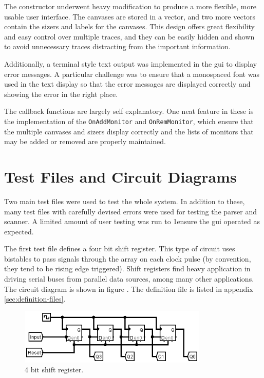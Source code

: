 \documentclass[a4paper,10pt]{article}  %
\begin{document}
The constructor underwent heavy modification to produce a more
flexible, more usable user interface. The canvases are stored in a
vector, and two more vectors contain the sizers and labels for the
canvases. This design offers great flexibility and easy control over
multiple traces, and they can be easily hidden and shown to avoid
unnecessary traces distracting from the important information.

Additionally, a terminal style text output was implemented in the gui
to display error messages. A particular challenge was to ensure that a
monospaced font was used in the text display so that the error
messages are displayed correctly and showing the error in the right
place.

The callback functions are largely self explanatory. One neat feature
in these is the implementation of the \texttt{OnAddMonitor} and
\texttt{OnRemMonitor}, which ensure that the multiple canvases and
sizers display correctly and the lists of monitors that may be added
or removed are properly maintained.

\section{Test Files and Circuit Diagrams}
\label{sec:test-files-circuit}

Two main test files were used to test the whole system. In addition to
these, many test files with carefully devised errors were used for
testing the parser and scanner. A limited amount of user testing was
run to 1ensure the gui operated as expected.

The first test file defines a four bit shift register. This type of
circuit uses bistables to pass signals through the array on each clock
pulse (by convention, they tend to be rising edge triggered). Shift
registers find heavy application in driving serial buses from parallel
data sources, among many other applications. The circuit diagram is
shown in figure . The definition file is listed in appendix
\ref{sec:definition-files}.
\begin{figure}[htb]
  \begin{center}
    \includegraphics[width=0.8\textwidth]{shift.png}
  \end{center}
  \caption{4 bit shift register.}
  \label{fig:shiftreg}
\end{figure}
\end{document}
